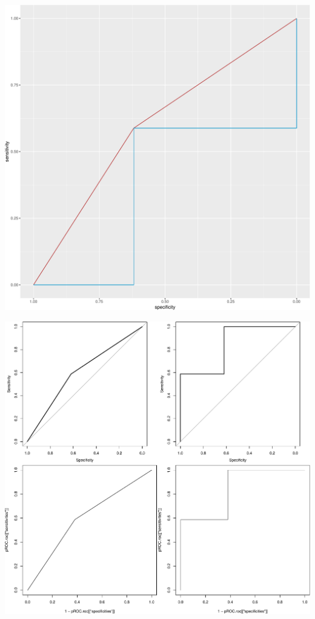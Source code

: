 \documentclass[article]{jss}
\begin{document}
\begin{CodeChunk}


\begin{center}\includegraphics{index_files/figure-latex/unnamed-chunk-8-1} \end{center}

\end{CodeChunk}

\begin{CodeChunk}


\begin{center}\includegraphics{index_files/figure-latex/unnamed-chunk-9-1} \end{center}

\end{CodeChunk}
\end{document}
